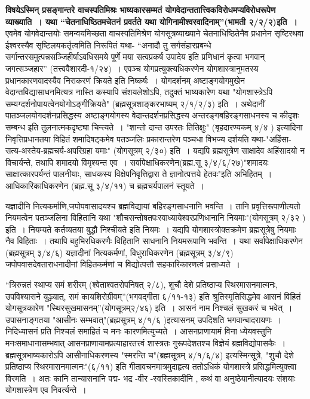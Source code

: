 {\textbf{विषयेऽस्मिन् प्रसङ्गान्तरे वाचस्पतिमिश्रः भाष्यकारसम्मतं योगवेदान्ततात्त्विकविरोधमप्यविरोधरूपेण व्याख्याति~। यथा “चेतनाधिष्ठितमचेतनं प्रवर्तते यथा योगिनामीश्वरवादिनाम्”(भामती २/२/२)इति~। } एवमेव योगवेदान्तयोः समन्वयमिच्छता वाचस्पतिमिश्रेण योगसूत्रव्याख्याने चेतनाधिष्ठितेनैव प्रधानेन सृष्टिरथवा ईश्वरस्यैव सृष्टिलयकर्तृत्वमिति निरूपितं यथा- “अनादौ तु सर्गसंहारप्रबन्धे सर्गान्तरसमुत्पन्नसञ्जिहीर्षाऽवधिसमये पूर्णे मया सत्वप्रकर्ष उपादेय इति प्रणिधानं कृत्वा भगवान् जगत्सञ्जहार” (तत्त्ववैशारदी-१/२४)~। एवञ्च योगप्रत्युक्त्यधिकरणेन योगशास्त्रानुमतस्य प्रधानकारणवादस्यैव निराकरणं क्रियते इति निष्कर्षः~। योगदर्शनम् अष्टाङ्गयोगमुखेन वेदान्तविद्यासाधनमित्यत्र नास्ति कस्यापि संशयलेशोऽपि, तदुक्तं भाष्यकारेण यथा "योगशास्त्रेऽपि सम्यग्दर्शनोपायत्वेनयोगोऽङ्गीक्रियते" (ब्रह्मसूत्रशाङ्करभाष्यम् २/१/२/३) इति~। अथेदानीं पातञ्जलयोगदर्शनप्रसिद्धस्य अष्टाङ्गयोगस्य वेदान्तदर्शनप्रसिद्धस्य अन्तरङ्गबहिरङ्गसाधनस्य च कीदृशः सम्बन्ध इति तुलनात्मकदृष्ट्या चिन्त्यते~। "शान्तो दान्त उपरतः तितिक्षुः" (बृहदारण्यकम् ४/४ ) इत्यादिना निवृत्तिप्रधानतया विहितं शमादिषट्कमेव पतञ्जलिः प्रकारान्तरेण पञ्चधा विभज्य दर्शयति यथा-"अहिंसा-सत्य-अस्तेय-ब्रह्मचर्य-अपरिग्रहा यमाः" (योगसूत्रम् २/३०) इति~। यद्यपि ब्रह्मसूत्रेण साक्षादेव अहिंसादयो न विचार्यन्ते, तथापि शमादयो विमृश्यन्त एव~। सर्वापेक्षाधिकरणेन(ब्रह्म.सू ३/४/६/२७)"शमादयः साक्षात्कारपर्यन्तं पालनीयाः, साधकस्य विक्षेपनिवृत्तिद्वारा ते ज्ञानोत्पत्तये हेतवः"इति अभिहितम्~। आधिकारिकाधिकरणेन (ब्रह्म.सू ३/४/११) च ब्रह्मचर्यपालनं स्तूयते~। 

यज्ञादीनि नित्यकर्माणि,जपोपवासादयश्च ब्रह्मविद्यायां बहिरङ्गसाधनानि भवन्ति~। तानि प्रवृत्तिरूपाणीत्यतो नियमत्वेन पतञ्जलिना विहितानि यथा "शौचसन्तोषतपःस्वाध्यायेश्वरप्रणिधानानि नियमाः"(योगसूत्रम् २/३२ ) इति~। नियम्यते कर्तव्यतया बुद्धौ निश्चीयते इति नियमः~। यद्यपि योगशास्त्रोक्तक्रमेण ब्रह्मसूत्रेषु नियमाः नैव विहिताः~। तथापि बहुभिरधिकरणैः विहितानि साधनानि नियमरूपाणि भवन्ति~। यथा सर्वापेक्षाधिकरणेन (ब्रह्मसूत्रम् ३/४/६) यज्ञादीनां नित्यकर्मणां, विधुराधिकरणेन (ब्रह्मसूत्रम् ३/४/९) जपोपवासदेवताराधनादीनां विहितकर्मणां च विद्योत्पत्तौ सहकारिकारणत्वं प्रसाध्यते~। 

“त्रिरुन्नतं स्थाप्य समं शरीरम् (श्वेताश्वतरोपनिषत् २/८), शुचौ देशे प्रतिष्ठाप्य स्थिरमासनमात्मनः, उपविश्यासने युञ्ज्यात्, समं कायशिरोग्रीवम्”(भगवद्गीता ६/११-१३) इति श्रुतिस्मृतिसिद्धमेव आसनं विहितं योगसूत्रकारेण "स्थिरसुखमासनम्”(योगसूत्रम्२/४६) \break इति~। आसनं नाम निश्चलं सुखकरं च भवेत्~। उपासनाङ्गतया "आसीनः सम्भवात्"(ब्रह्मसूत्रम् ४/१/६ )इत्यासनम् उपदिशति भगवान्बादरायणः~। निदिध्यासनं प्रति निश्चलं समाहितं च मनः कारणमित्युच्यते~। आसनप्राणायामं विना ध्येयवस्तुनि मनःसमाधानासम्भवात् आसनप्राणायामप्रत्याहारतत्त्वं शास्त्रतः गुरूपदेशतश्च विज्ञेयं ब्रह्मविद्योपासकैः~। ब्रह्मसूत्रभाष्यकारोऽपि आसीनाधिकरणस्य "स्मरन्ति च"(ब्रह्मसूत्रम् ४/१/६/४) इत्यस्मिन्सूत्रे, "शुचौ देशे प्रतिष्ठाप्य स्थिरमासनमात्मनः"(६/११) इति गीतावचनमात्रमुदाहृत्य ततोऽधिकं योगशास्त्रे प्रसिद्धमित्युक्त्वा विरमति~। अतः कानि तान्यासनानि पद्म- भद्र -वीर -स्वस्तिकादीनि , कथं वा अनुष्ठेयानीत्यादयः संशयाः योगशास्त्रेण एव निवर्त्यन्ते~। 

}
